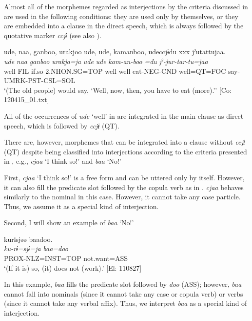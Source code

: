   Almost all of the morphemes regarded as interjections by the criteria discussed in  are used in the following conditions: they are used only by themselves, or they are embedded into a clause in the direct speech, which is always followed by the quotative marker \textit{ccjɨ} (see also ).

\ea{} \label{ex:4.57}
\glll   ude,  naa,  ganboo,  urakjoo  ude,  ude,  kamanboo,   udeccjɨdu  xxx  jˀutattujaa.\\
    \textit{ude}  \textit{naa}  \textit{ganboo}  \textit{urakja=ja}  \textit{ude}  \textit{ude}  \textit{kam-an-boo}   \textit{=du}    \textit{jˀ-jur-tar-tu=jaa}\\
    well  FIL  if.so  2.NHON.SG=TOP  well  well  eat-NEG-CND                                                            well=QT=FOC    say-UMRK-PST-CSL=SOL\\
  \glt     ‘(The old people) would say, ‘Well, now, then, you have to eat (more).’’ [Co: 120415\_01.txt]
  \z

All of the occurrences of \textit{ude} ‘well’ in  are integrated in the main clause as direct speech, which is followed by \textit{ccjɨ} (QT).

There are, however, morphemes that can be integrated into a clause without \textit{ccjɨ} (QT) despite being classified into interjections according to the criteria presented in , e.g., \textit{cjaa} ‘I think so!’ and \textit{baa} ‘No!’

First, \textit{cjaa} ‘I think so!’ is a free form and can be uttered only by itself. However, it can also fill the predicate slot followed by the copula verb as in . \textit{cjaa} behaves similarly to the nominal in this case. However, it cannot take any case particle. Thus, we assume it as a special kind of interjection.  

Second, I will show an example of \textit{baa} ‘No!’

\ea \label{ex:4.58}
\glll    kurɨsjəə  baadoo.\\
    \textit{ku-rɨ=sjɨ=ja}  \textit{baa=doo}\\
    PROX-NLZ=INST=TOP  not.want=ASS\\
  \glt     ‘(If it is) so, (it) does not (work).’ [El: 110827]
\z

In this example, \textit{baa} fills the predicate slot followed by \textit{doo} (ASS); however, \textit{baa} cannot fall into nominals (since it cannot take any case or copula verb) or verbs (since it cannot take any verbal affix). Thus, we interpret \textit{baa} as a special kind of interjection.

